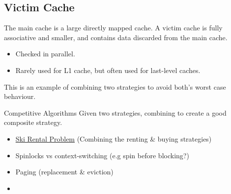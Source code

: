 \subsection{Victim Cache}
The main cache is a large directly mapped cache. A victim cache is fully associative and smaller, and contains data discarded from the main cache.
\begin{itemize}
    \item Checked in parallel.
    \item Rarely used for L1 cache, but often used for last-level caches.
\end{itemize}
This is an example of combining two strategies to avoid both's worst case behaviour.
\begin{sidenotebox}{Competitive Algorithms}
    Given two strategies, combining to create a good composite strategy.
    \begin{itemize}
        \item \href{https://en.wikipedia.org/wiki/Ski_rental_problem}{Ski Rental Problem} (Combining the renting \& buying strategies)
        \item Spinlocks vs context-switching (e.g spin before blocking?)
        \item Paging (replacement \& eviction)
        \item 
    \end{itemize}
\end{sidenotebox}

